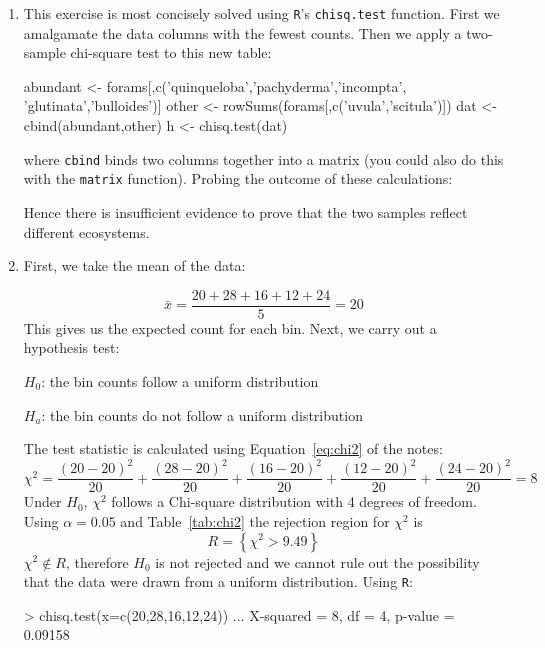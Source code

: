 \begin{enumerate}

\item This exercise is most concisely solved using \texttt{R}'s
  \texttt{chisq.test} function. First we amalgamate the data columns
  with the fewest counts. Then we apply a two-sample chi-square test
  to this new table:

\begin{script}
abundant <- forams[,c('quinqueloba','pachyderma','incompta',
                      'glutinata','bulloides')]
other <- rowSums(forams[,c('uvula','scitula')])
dat <- cbind(abundant,other)
h <- chisq.test(dat)
\end{script}

\noindent where \texttt{cbind} binds two columns together into a
matrix (you could also do this with the \texttt{matrix}
function). Probing the outcome of these calculations:


Hence there is insufficient evidence to prove that the two samples
reflect different ecosystems.

\item First, we take the mean of the data:

  \[
  \bar{x} = \frac{20 + 28 + 16 + 12 + 24}{5} = 20
  \]
  This gives us the expected count for each bin.  Next, we carry out a
  hypothesis test:

  $H_0$: the bin counts follow a uniform distribution

  $H_a$: the bin counts do not follow a uniform distribution

  The test statistic is calculated using Equation~\ref{eq:chi2} of the notes:
  \[
  \chi^2 = \frac{(20-20)^2}{20} + \frac{(28-20)^2}{20} + \frac{(16-20)^2}{20} +
  \frac{(12-20)^2}{20} + \frac{(24-20)^2}{20} = 8
  \]
  \noindent Under $H_0$, $\chi^2$ follows a Chi-square distribution
  with 4 degrees of freedom. Using $$ and
  Table~\ref{tab:chi2} the rejection region for $\chi^2$ is
  \[
  R = \left\{\chi^2>9.49\right\}
  \]
  \noindent$\chi^2 \notin R$, therefore $H_0$ is not rejected and we
  cannot rule out the possibility that the data were drawn from a
  uniform distribution. Using \texttt{R}:

\begin{console}
> chisq.test(x=c(20,28,16,12,24))
...
X-squared = 8, df = 4, p-value = 0.09158
\end{console}


\end{enumerate}
